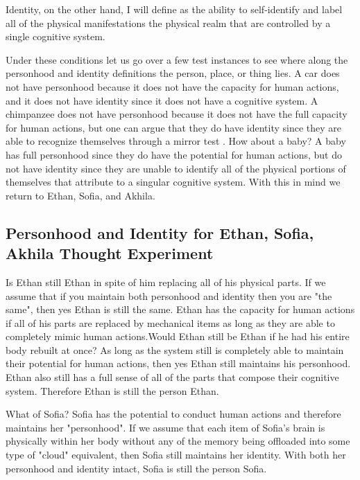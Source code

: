 \documentclass[
	letterpaper, %
]{jdf}
\begin{document}
Identity, on the other hand, I will define as the ability to self-identify and label all of the physical manifestations the physical realm that are controlled by a single cognitive system.

Under these conditions let us go over a few test instances to see where along the personhood and identity definitions the person, place, or thing lies. A car does not have personhood because it does not have the capacity for human actions, and it does not have identity since it does not have a cognitive system. A chimpanzee does not have personhood because it does not have the full capacity for human actions, but one can argue that they do have identity since they are able to recognize themselves through a mirror test \citep{Chimpanzee}. How about a baby? A baby has full personhood since they do have the potential for human actions, but do not have identity since they are unable to identify all of the physical portions of themselves that attribute to a singular cognitive system. With this in mind we return to Ethan, Sofia, and Akhila.
\subsection{Personhood and Identity for Ethan, Sofia, Akhila Thought Experiment}
Is Ethan still Ethan in spite of him replacing all of his physical parts. If we assume that if you maintain both personhood and identity then you are "the same", then yes Ethan is still the same. Ethan has the capacity for human actions if all of his parts are replaced by mechanical items as long as they are able to completely mimic human actions.Would Ethan still be Ethan if he had his entire body rebuilt at once? As long as the system still is completely able to maintain their potential for human actions, then yes Ethan still maintains his personhood. Ethan also still has a full sense of all of the parts that compose their cognitive system. Therefore Ethan is still the person Ethan. 

What of Sofia? Sofia has the potential to conduct human actions and therefore maintains her "personhood". If we assume that each item of Sofia's brain is physically within her body without any of the memory being offloaded into some type of "cloud" equivalent, then Sofia still maintains her identity. With both her personhood and identity intact, Sofia is still the person Sofia.
\end{document}
